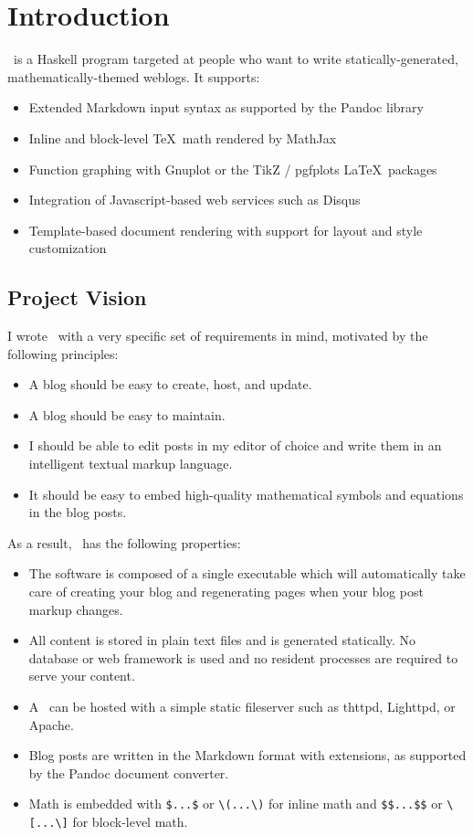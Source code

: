 \documentclass[11pt, letterpaper, oneside, titlepage]{book}
\begin{document}




\chapter{Introduction}

\mathblog\ is a Haskell program targeted at people who want to write
statically-generated, mathematically-themed weblogs.  It supports:

\begin{itemize}
\item{Extended Markdown input syntax as supported by the Pandoc
  library}
\item{Inline and block-level \TeX\ math rendered by MathJax}
\item{Function graphing with Gnuplot or the TikZ / pgfplots
  \LaTeX\ packages}
\item{Integration of Javascript-based web services such as Disqus}
\item{Template-based document rendering with support for layout and
  style customization}
\end{itemize}

\section{Project Vision}

I wrote \mathblog\ with a very specific set of requirements in mind,
motivated by the following principles:

\begin{itemize}
\item{A blog should be easy to create, host, and update.}
\item{A blog should be easy to maintain.}
\item{I should be able to edit posts in my editor of choice and write
  them in an intelligent textual markup language.}
\item{It should be easy to embed high-quality mathematical symbols and
  equations in the blog posts.}
\end{itemize}

As a result, \mathblog\ has the following properties:

\begin{itemize}
\item{The software is composed of a single executable which will
  automatically take care of creating your blog and regenerating pages
  when your blog post markup changes.}
\item{All content is stored in plain text files and is generated
  statically.  No database or web framework is used and no resident
  processes are required to serve your content.}
\item{A \mathblog\ can be hosted with a simple static fileserver such
  as thttpd, Lighttpd, or Apache.}
\item{Blog posts are written in the Markdown format with extensions,
  as supported by the Pandoc document converter.}
\item{Math is embedded with \verb|$...$| or \verb|\(...\)| for inline
  math and \verb|$$...$$| or \verb|\[...\]| for block-level math.}
\end{itemize}
\end{document}
